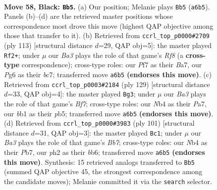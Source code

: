 \documentclass[11pt]{article}
\begin{document}
\clearpage

\begin{figure}[p]\centering
\begin{subfigure}{0.46\textwidth}\centering
\resizebox{\linewidth}{!}{%
\newchessgame
\chessboard[
  setfen={5k2/2r2p1p/b5p1/4P3/1n2NPp1/8/5K1P/1B6 b - - 7 58},
  showmover=false,
  pgfstyle=straightmove, color=movearrow, markmove={a6-b5}
]}
\caption{}
\end{subfigure}\hfill
\begin{subfigure}{0.46\textwidth}\centering
\resizebox{\linewidth}{!}{%
\newchessgame
\chessboard[
  setfen={8/bPB2k2/5p2/3p2p1/1N4P1/2P5/2K5/5r2 b - - 6 57},
  showmover=false,
  pgfstyle=straightmove, color=movearrow, markmove={f1-f2}
]}
\caption{}
\end{subfigure}
\\[4pt]
\begin{subfigure}{0.46\textwidth}\centering
\resizebox{\linewidth}{!}{%
\newchessgame
\chessboard[
  setfen={5k2/p5p1/1p5p/1P2P2P/8/3K4/5b2/1B6 b - - 16 65},
  showmover=false,
  pgfstyle=straightmove, color=movearrow, markmove={f2-g3}
]}
\caption{}
\end{subfigure}\hfill
\begin{subfigure}{0.46\textwidth}\centering
\resizebox{\linewidth}{!}{%
\newchessgame
\chessboard[
  setfen={8/1p5k/1BpnN3/5p2/1K3P2/3P3P/1b6/8 b - - 10 51},
  showmover=false,
  pgfstyle=straightmove, color=movearrow, markmove={b2-c1}
]}
\caption{}
\end{subfigure}
\caption{\textbf{Move 58, Black: \texttt{Bb5}.} (a) Our position; Melanie plays \texttt{Bb5} (\texttt{a6b5}). Panels (b)--(d) are the retrieved master positions whose correspondence most drove this move (highest QAP objective among those that transfer to it). (b) Retrieved from \texttt{ccrl\_top\_p0000\#2709} (ply 113) [structural distance $d$=29, QAP obj=5]: the master played \texttt{Rf2+}; under $\mu$ our \emph{Ba3} plays the role of that game's \emph{Rf8} (a \textbf{cross-type} correspondence); cross-type roles: our \emph{P}f7 as their \emph{B}a7, our \emph{P}g6 as their \emph{b}c7; transferred move \texttt{a6b5} \textbf{(endorses this move)}. (c) Retrieved from \texttt{ccrl\_top\_p0003\#2184} (ply 129) [structural distance $d$=33, QAP obj=4]: the master played \texttt{Bg3}; under $\mu$ our \emph{Ba3} plays the role of that game's \emph{Bf7}; cross-type roles: our \emph{N}b4 as their \emph{P}a7, our \emph{b}b1 as their \emph{p}b5; transferred move \texttt{a6b5} \textbf{(endorses this move)}. (d) Retrieved from \texttt{ccrl\_top\_p0000\#3983} (ply 101) [structural distance $d$=31, QAP obj=3]: the master played \texttt{Bc1}; under $\mu$ our \emph{Ba3} plays the role of that game's \emph{Bb7}; cross-type roles: our \emph{N}b4 as their \emph{P}b7, our \emph{p}h2 as their \emph{b}b6; transferred move \texttt{a6b5} \textbf{(endorses this move)}. Synthesis: 15 retrieved analogs transferred to \texttt{Bb5} (summed QAP objective 45, the strongest correspondence among the candidate moves); Melanie committed it via the \texttt{search} selector.}
\label{fig:thought-m115}
\end{figure}
\end{document}
